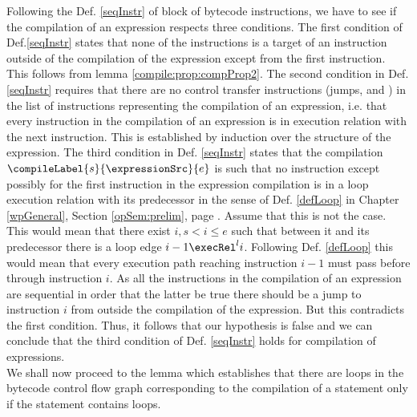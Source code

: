 Following the Def. \ref{seqInstr} of block of bytecode instructions,  we have to see if the compilation of an expression respects
three conditions.
The first condition of Def.\ref{seqInstr} states that none of the instructions is a target of an instruction
outside of the compilation of the expression except from the first instruction. This follows from lemma \ref{compile:prop:compProp2}. 
The second condition in Def. \ref{seqInstr}  requires that there are no control 
transfer instructions (jumps, \return and \athrow)  in the list of instructions representing the  compilation of an expression, i.e. that every 
instruction in the compilation of an expression is in execution relation with the next instruction.
This is established by induction over the structure of the expression.
The third condition in Def. \ref{seqInstr} states that  the compilation $\compileLabel{s}{\expressionSrc}{e}$ is such that 
no instruction except possibly for the first instruction in the expression compilation is in a loop execution relation with its predecessor in the sense of 
Def.  \ref{defLoop} in Chapter \ref{wpGeneral}, Section \ref{opSem:prelim}, page \pageref{opSem:prelim}.
Assume that this is not the case. This would mean that there exist $i, s < i \le e  $  such that between it and its predecessor there is a loop edge
 $ i-1 \execRel^{l} i$.  Following Def. \ref{defLoop}  this would mean that every execution path reaching instruction $i-1$  must pass before through instruction $i$.
As all the instructions in the compilation of an expression are sequential in order that the latter be true there should be a jump to instruction $i$ from outside
the compilation of the expression. But this contradicts the first condition. Thus, it follows that our hypothesis is false and we can conclude that the third condition 
of Def. \ref{seqInstr} holds for compilation of expressions.
 \Qed \\
 
We shall now proceed to the lemma which establishes that there are loops in the bytecode control flow graph corresponding to the compilation of a statement
only if the statement contains loops. 

